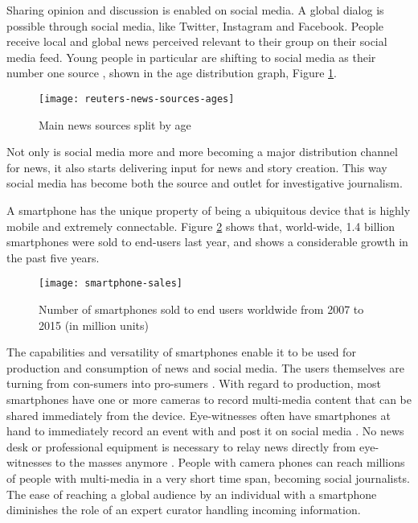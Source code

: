 Sharing opinion and discussion is enabled on social media.
A global dialog is possible through social media, like Twitter, Instagram and Facebook.
People receive local and global news perceived relevant to their group on their social media feed.
Young people in particular are shifting to social media as their number one source \cite{reuters_social_media}, shown in the age distribution graph, Figure \ref{fig:reuters-news-sources-ages}.
\begin{figure}[H]
	\centering
	\texttt{[image: reuters-news-sources-ages]}
	\caption{Main news sources split by age \cite{reuters_social_media}}
	\label{fig:reuters-news-sources-ages}
\end{figure}
Not only is social media more and more becoming a major distribution channel for news, it also starts delivering input for news and story creation.
This way social media has become both the source and outlet for investigative journalism.

A smartphone has the unique property of being a ubiquitous device that is highly mobile and extremely connectable.
Figure \ref{fig:smartphone-sales} shows that, world-wide, 1.4 billion smartphones were sold to end-users last year, and shows a considerable growth in the past five years.
\begin{figure}[H]
	\centering
	\texttt{[image: smartphone-sales]}
	\caption{Number of smartphones sold to end users worldwide from 2007 to 2015 (in million units) \cite{smartphone-sales}}
	\label{fig:smartphone-sales}
\end{figure}

The capabilities and versatility of smartphones enable it to be used for production and consumption of news and social media.
The users themselves are turning from con-sumers into pro-sumers \cite{news_crowd}.
With regard to production, most smartphones have one or more cameras to record multi-media content that can be shared immediately from the device.
Eye-witnesses often have smartphones at hand to immediately record an event with and post it on social media \cite{paris-attacks}.
No news desk or professional equipment is necessary to relay news directly from eye-witnesses to the masses anymore \cite{belgium-attacks}.
People with camera phones can reach millions of people with multi-media in a very short time span, becoming social journalists.
The ease of reaching a global audience by an individual with a smartphone diminishes the role of an expert curator handling incoming information.

